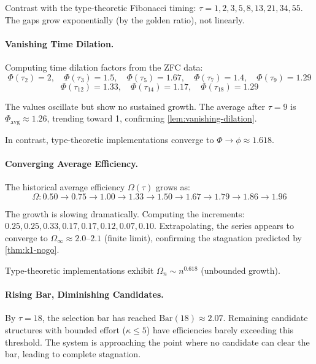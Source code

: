 \documentclass[11pt]{article}
\theoremstyle{definition}
\theoremstyle{remark}
\begin{document}
Contrast with the type-theoretic Fibonacci timing: $\tau = 1, 2, 3, 5, 8, 13, 21, 34, 55$. The gaps grow exponentially (by the golden ratio), not linearly.

\paragraph{Vanishing Time Dilation.}
Computing time dilation factors from the ZFC data:
\[
\Phi(\tau_2) = 2, \quad \Phi(\tau_3) = 1.5, \quad \Phi(\tau_5) = 1.67, \quad \Phi(\tau_7) = 1.4, \quad \Phi(\tau_9) = 1.29
\]
\[
\Phi(\tau_{12}) = 1.33, \quad \Phi(\tau_{14}) = 1.17, \quad \Phi(\tau_{18}) = 1.29
\]

The values oscillate but show no sustained growth. The average after $\tau = 9$ is $\Phi_{\text{avg}} \approx 1.26$, trending toward 1, confirming \cref{lem:vanishing-dilation}.

In contrast, type-theoretic implementations converge to $\Phi \to \phi \approx 1.618$.

\paragraph{Converging Average Efficiency.}
The historical average efficiency $\Omega(\tau)$ grows as:
\[
\Omega: 0.50 \to 0.75 \to 1.00 \to 1.33 \to 1.50 \to 1.67 \to 1.79 \to 1.86 \to 1.96
\]

The growth is slowing dramatically. Computing the increments: $0.25, 0.25, 0.33, 0.17, 0.17, 0.12, 0.07, 0.10$. Extrapolating, the series appears to converge to $\Omega_\infty \approx 2.0$--$2.1$ (finite limit), confirming the stagnation predicted by \cref{thm:k1-nogo}.

Type-theoretic implementations exhibit $\Omega_n \sim n^{0.618}$ (unbounded growth).

\paragraph{Rising Bar, Diminishing Candidates.}
By $\tau = 18$, the selection bar has reached $\text{Bar}(18) \approx 2.07$. Remaining candidate structures with bounded effort ($\kappa \leq 5$) have efficiencies barely exceeding this threshold. The system is approaching the point where no candidate can clear the bar, leading to complete stagnation.
\end{document}

